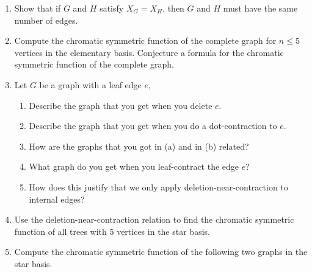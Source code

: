 \documentclass{article}
\begin{document}
\begin{enumerate}
\item Show that if $G$ and $H$ satisfy $X_G = X_H$, then $G$ and $H$ must have the same number of edges. 

\item Compute the chromatic symmetric function of the complete graph for $n\leq 5$ vertices in the elementary basis.   Conjecture a formula for the chromatic symmetric function of the complete graph. 

\item Let $G$ be a graph with a leaf edge $e$, 
\begin{enumerate}
    \item Describe the graph that you get when you delete $e$. 
    \item Describe the graph that you get when you do a dot-contraction to $e$. 
    \item How are the graphs that you got in (a) and in (b) related?
    \item What graph do you get when you leaf-contract the edge $e$?
    \item How does this justify that we only apply deletion-near-contraction to internal edges? 
\end{enumerate}

 
\item Use the deletion-near-contraction relation to find the chromatic symmetric function of all trees with 5 vertices in the star basis. 

\item  Compute the chromatic symmetric function of the following two graphs in the star basis. 

\begin{center}
\hskip 1in 
\begin{tikzpicture}[scale=0.4, auto, 
    vertex/.style={circle, draw, fill=black, minimum size=.5mm}]


\end{tikzpicture}
\end{center}
\end{enumerate}
\end{document}
